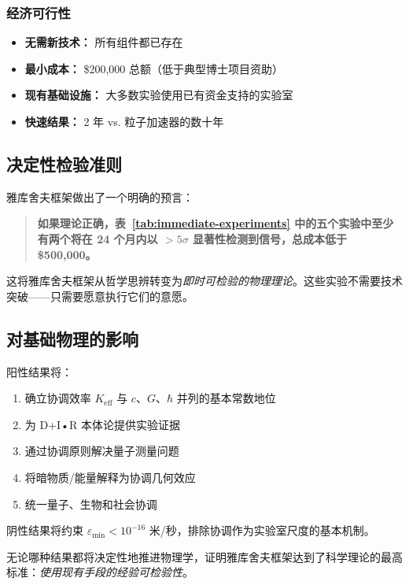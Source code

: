 \documentclass[11pt,a4paper]{article}
\begin{document}
	\subsubsection{经济可行性}
	
	\begin{itemize}
		\item \textbf{无需新技术：} 所有组件都已存在
		\item \textbf{最小成本：} \$200,000 总额（低于典型博士项目资助）
		\item \textbf{现有基础设施：} 大多数实验使用已有资金支持的实验室
		\item \textbf{快速结果：} 2 年 vs. 粒子加速器的数十年
	\end{itemize}
	
	\subsection{决定性检验准则}
	
	雅库舍夫框架做出了一个明确的预言：
	
	\begin{quote}
		\textbf{如果理论正确，表~\ref{tab:immediate-experiments} 中的五个实验中至少有两个将在 24 个月内以 $>5\sigma$ 显著性检测到信号，总成本低于 \$500,000。}
	\end{quote}
	
	这将雅库舍夫框架从哲学思辨转变为\textit{即时可检验的物理理论}。这些实验不需要技术突破——只需要愿意执行它们的意愿。
	
	\subsection{对基础物理的影响}
	
	阳性结果将：
	\begin{enumerate}
		\item 确立协调效率 $K_{\mathrm{eff}}$ 与 $c$、$G$、$\hbar$ 并列的基本常数地位
		\item 为 D+I•R 本体论提供实验证据
		\item 通过协调原则解决量子测量问题
		\item 将暗物质/能量解释为协调几何效应
		\item 统一量子、生物和社会协调
	\end{enumerate}
	
	阴性结果将约束 $\varepsilon_{\min} < 10^{-16}$ 米/秒，排除协调作为实验室尺度的基本机制。
	
	无论哪种结果都将决定性地推进物理学，证明雅库舍夫框架达到了科学理论的最高标准：\emph{使用现有手段的经验可检验性}。
	
\end{document}
